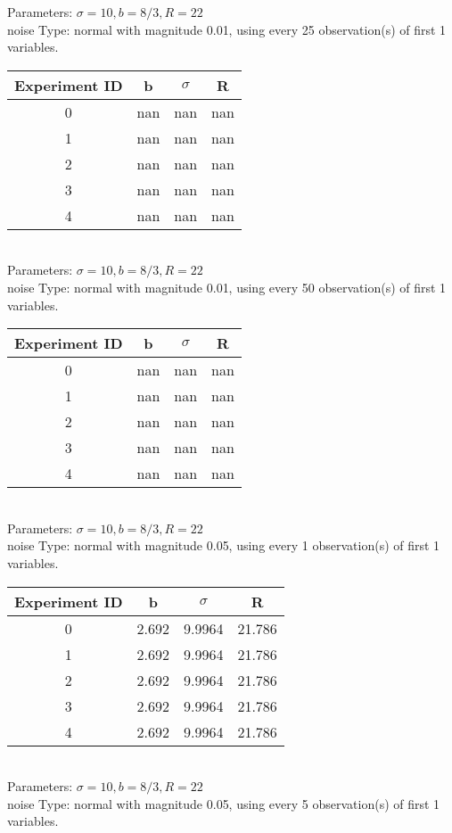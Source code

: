 \begin{multicols}{3}
Parameters: $\sigma=10, b=8/3, R=22$\\
noise Type: normal with magnitude 0.01, using every 25 observation(s) of first 1 variables.\\
\begin{tabular}{cccc}
\hline Experiment ID & b & $\sigma$ & R \\ \hline 
0 & nan & nan & nan\\ \hline 
 1 & nan & nan & nan\\ \hline 
 2 & nan & nan & nan\\ \hline 
 3 & nan & nan & nan\\ \hline 
 4 & nan & nan & nan\\ \hline 
 \end{tabular}\\
Parameters: $\sigma=10, b=8/3, R=22$\\
noise Type: normal with magnitude 0.01, using every 50 observation(s) of first 1 variables.\\
\begin{tabular}{cccc}
\hline Experiment ID & b & $\sigma$ & R \\ \hline 
0 & nan & nan & nan\\ \hline 
 1 & nan & nan & nan\\ \hline 
 2 & nan & nan & nan\\ \hline 
 3 & nan & nan & nan\\ \hline 
 4 & nan & nan & nan\\ \hline 
 \end{tabular}\\
Parameters: $\sigma=10, b=8/3, R=22$\\
noise Type: normal with magnitude 0.05, using every 1 observation(s) of first 1 variables.\\
\begin{tabular}{cccc}
\hline Experiment ID & b & $\sigma$ & R \\ \hline 
0 & 2.692 & 9.9964 & 21.786\\ \hline 
 1 & 2.692 & 9.9964 & 21.786\\ \hline 
 2 & 2.692 & 9.9964 & 21.786\\ \hline 
 3 & 2.692 & 9.9964 & 21.786\\ \hline 
 4 & 2.692 & 9.9964 & 21.786\\ \hline 
 \end{tabular}\\
Parameters: $\sigma=10, b=8/3, R=22$\\
noise Type: normal with magnitude 0.05, using every 5 observation(s) of first 1 variables.\\

\end{multicols}
